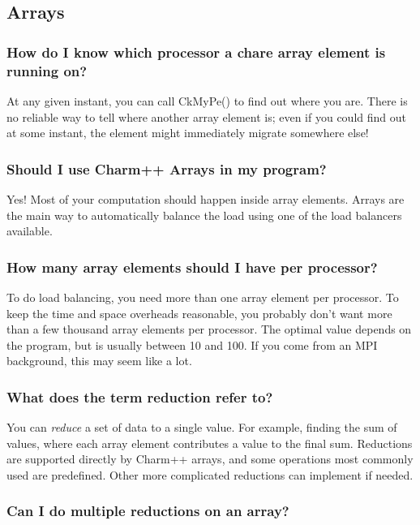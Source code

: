\subsection{\charmpp{} Arrays}

\subsubsection{How do I know which processor a chare array element is running on?}

At any given instant, you can call \textrm{CkMyPe()} to find out where
you are. There is no reliable way to tell where another array element is;
even if you could find out at some instant, the element might immediately
migrate somewhere else!

\subsubsection{Should I use Charm++ Arrays in my program?}

Yes! Most of your computation should happen inside array elements.
Arrays are the main way to automatically balance the load using one of the
load balancers available.

\subsubsection{How many array elements should I have per processor?}

To do load balancing, you need more than one array element per processor.
To keep the time and space overheads reasonable, you probably don't want
more than a few thousand array elements per processor. The optimal
value depends on the program, but is usually between 10 and 100.
If you come from an MPI background, this may seem like a lot.

\subsubsection{What does the term reduction refer to?}

You can {\em reduce} a set of data to a single value. For example,
finding the sum of values, where each array element contributes a value
to the final sum. Reductions are supported directly by Charm++ arrays, and some
operations most commonly used are predefined. Other more complicated reductions
can implement if needed.

\subsubsection{Can I do multiple reductions on an array?}

